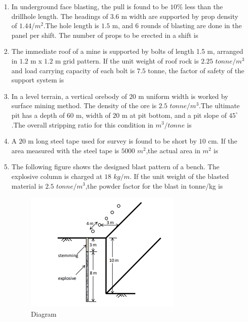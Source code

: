 \documentclass[journal,12pt,onecolumn]{IEEEtran}
\theoremstyle{remark}
\begin{document}
\begin{enumerate}
\hfill{}

\item In underground face blasting, the pull is found to be $10$\% less than the drillhole length. The headings of $3.6$ m width are supported by prop density of $1.44$/$m^2$.The hole length is $1.5$ m, and $6$ rounds of blasting are done in the panel per shift. The number of props to be erected in a shift is

\hfill{}
\item The immediate roof of a mine is supported by bolts of length 1.5 m, arranged in $1.2$ m x $1.2$ m grid pattern. If the unit weight of roof rock is $2.25$ $tonne/m^3$ and load carrying capacity of each bolt is $7.5$ tonne, the factor of safety of the support system is

\hfill{}
\item In a level terrain, a vertical orebody of $20$ m uniform width is worked by surface mining method. The density of the ore is $2.5$ $tonne/m^3$.The ultimate pit has a depth of $60$ m, width of $20$ m at pit bottom, and a pit slope of $45^\circ$.The overall stripping ratio for this condition in $m^3 /tonne$ is 

\hfill{}
\item A $20$ m long steel tape used for survey is found to be short by $10$ cm. If the area measured with the steel tape is $5000$ $m^2$,the actual area in $m^2$ is

\hfill{}
\item The following figure shows the designed blast pattern of a bench. The explosive column is charged at $18$ $kg/m$. If the unit weight of the blasted material is $2.5$ $tonne/m^3$,the powder factor for the blast in tonne/kg is
\begin{figure}[H]
  \centering
  \includegraphics[width=0.4\columnwidth]{figs/pattern.png}
  \caption{Diagram}
  \label{fig:pattern}
\end{figure}

\hfill{}



\end{enumerate}
\end{document}
